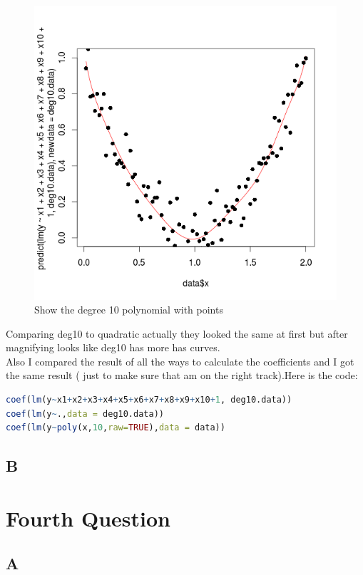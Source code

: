 \documentclass{article}
\begin{document}
\begin{multicols*}{2}
\begin{flushleft}
\begin{flushleft}
\begin{figure}[H]
\begin{center}
\includegraphics[scale=0.3]{plotdeg10.png}
\end{center}
\caption{Show the degree 10 polynomial with points}
\end{figure}
Comparing deg10 to quadratic actually they looked the same at first but after magnifying looks like deg10 has more has curves.\\
Also I compared the result of all the ways to calculate the coefficients and I got the same result ( just to make sure that am on the right track).Here is the code:
\begin{lstlisting}[language=R]
coef(lm(y~x1+x2+x3+x4+x5+x6+x7+x8+x9+x10+1, deg10.data))
coef(lm(y~.,data = deg10.data))
coef(lm(y~poly(x,10,raw=TRUE),data = data))
\end{lstlisting}
\end{flushleft}
{\centering\subsection*{B}}
{\centering \section*{Fourth Question}}
{\centering\subsection*{A}}

\end{flushleft}
\end{multicols*}
\end{document}
